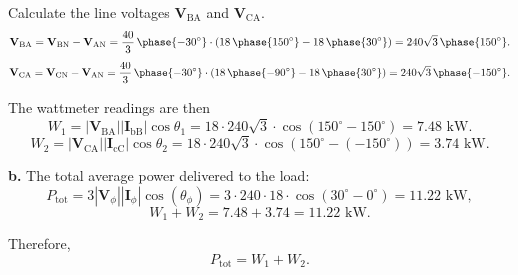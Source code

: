 \documentclass[11pt]{article}
\begin{document}
\begin{enumerate}[leftmargin=*,label=\textbf{\arabic*.}]
Calculate the line voltages $\mathbf{V}_{\text{BA}}$ and $\mathbf{V}_{\text{CA}}$.
\[\mathbf{V}_{\text{BA}}=\mathbf{V}_{\text{BN}}-\mathbf{V}_{\text{AN}}=\frac{40}3\,\phase{-30^\circ}\cdot(18\,\phase{150^\circ}-18\,\phase{30^\circ})=240\sqrt3\,\phase{150^\circ}.\]
\[\mathbf{V}_{\text{CA}}=\mathbf{V}_{\text{CN}}-\mathbf{V}_{\text{AN}}=\frac{40}3\,\phase{-30^\circ}\cdot(18\,\phase{-90^\circ}-18\,\phase{30^\circ})=240\sqrt3\,\phase{-150^\circ}.\]

The wattmeter readings are then
\[W_1=|\mathbf{V}_{\text{BA}}||\mathbf{I}_{\text{bB}}|\cos\theta_1=18\cdot240\sqrt3\cdot\cos(150^\circ-150^\circ)=7.48\text{ kW}.\]
\[W_2=|\mathbf{V}_{\text{CA}}||\mathbf{I}_{\text{cC}}|\cos\theta_2=18\cdot240\sqrt3\cdot\cos(150^\circ-(-150^\circ))=3.74\text{ kW}.\]

\textbf{b.} The total average power delivered to the load:
\[P_{\text{tot}}=3|\mathbf{V}_\phi||\mathbf{I}_\phi|\cos(\theta_\phi)=3\cdot240\cdot18\cdot\cos(30^\circ-0^\circ)=11.22\text{ kW},\]
\[W_1+W_2=7.48+3.74=11.22\text{ kW}.\]

Therefore,
\[P_{\text{tot}}=W_1+W_2.\]

\end{enumerate}
\end{document}
